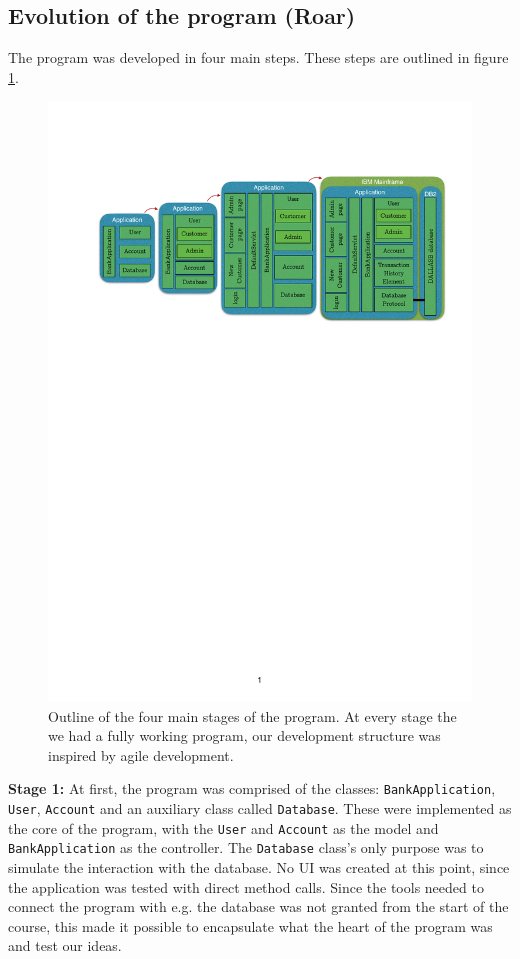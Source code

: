 \subsection{Evolution of the program (Roar)}

The program was developed in four main steps. These steps are outlined in figure \ref{fig:PE}.

\begin{figure}[H]
    \centering
    \includegraphics[width=\textwidth]{figures/PE}
    \caption{Outline of the four main stages of the program. At every stage the we had a fully working program, our development structure was inspired by agile development.}
    \label{fig:PE}
\end{figure}

\textbf{Stage 1:} At first, the program was comprised of the classes: \texttt{BankApplication}, \texttt{User}, \texttt{Account} and an auxiliary class called \texttt{Database}. These were implemented as the core of the program, with the \texttt{User} and \texttt{Account} as the model and \texttt{BankApplication} as the controller. The \texttt{Database} class's only purpose was to simulate the interaction with the database. No UI was created at this point, since the application was tested with direct method calls. Since the tools needed to connect the program with e.g. the database was not granted from the start of the course, this made it possible to encapsulate what the heart of the program was and test our ideas.

